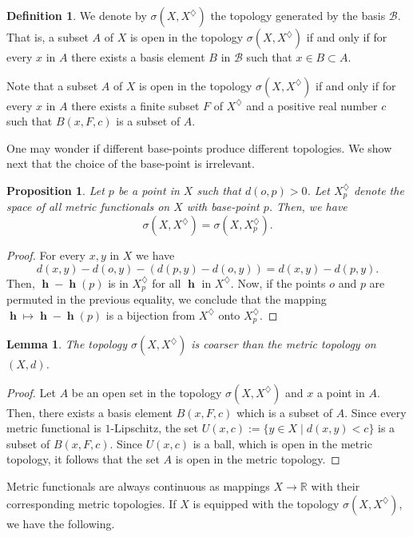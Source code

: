 \documentclass[11pt]{amsart}
\newtheorem{lemma}[theorem]{Lemma}
\newtheorem{proposition}[theorem]{Proposition}
\theoremstyle{definition}
\newtheorem{definition}[theorem]{Definition}
\numberwithin{equation}{section}
\DeclareMathOperator{\h}{\mathbf{h}} %
\newcommand{\R}{\mathbb{R}}  %
\numberwithin{equation}{section}
\begin{document}
\begin{definition}
We denote by $\sigma(X,X^\diamondsuit)$ the topology generated 
by the basis $\mathscr{B}$. That is, a subset $A$ of $X$ is 
open in the topology $\sigma(X,X^\diamondsuit)$ if and only 
if for every $x$ in $A$ there exists a basis element $B$ 
in $\mathscr{B}$ such that $x\in B \subset A$.    
\end{definition}

Note that a subset $A$ of $X$ is open in the topology
$\sigma(X,X^\diamondsuit)$ if and only if for every $x$ 
in $A$ there exists a finite subset $F$ of $X^\diamondsuit$ 
and a positive real number $c$ such that $B(x,F,c)$ is a 
subset of $A$. 

One may wonder if different base-points produce different 
topologies. We show next that the choice of the base-point 
is irrelevant.

\begin{proposition}
Let $p$ be a point in $X$ such that $d(o,p)> 0$. 
Let $X_p^\diamondsuit$ denote the space of all metric functionals 
on $X$ with base-point $p$. Then, we have
$$
    \sigma(X,X^\diamondsuit)=\sigma(X,X_p^\diamondsuit).
$$
\end{proposition}
\begin{proof}
For every $x,y$ in $X$ we have 
$$ d(x,y)-d(o,y)-(d(p,y)-d(o,y)) = d(x,y)-d(p,y).$$
Then, $\h - \h(p)$ is in $X_p^\diamondsuit$ for all $\h$ in 
$X^\diamondsuit$. Now, if the points $o$ and $p$ are permuted 
in the previous equality, we conclude that the mapping 
$\h\mapsto \h - \h(p)$ is a bijection from $X^\diamondsuit$ 
onto $X_p^\diamondsuit$.
\end{proof}

\begin{lemma}\label{lem:coarse}
The topology $\sigma(X,X^\diamondsuit)$ is coarser than 
the metric topology on $(X,d)$. 
\end{lemma}

\begin{proof}
Let $A$ be an open set in the topology $\sigma(X,X^\diamondsuit)$
and $x$ a point in $A$. Then, there exists a basis element 
$B(x,F,c)$ which is a subset of $A$. Since every metric 
functional is $1$-Lipschitz, the set 
$U(x,c):=\{y\in X \mid d(x,y) < c\}$ is a subset of 
$B(x,F,c)$. Since $U(x,c)$ is a ball, which is
open in the metric topology, it follows that the set $A$ 
is open in the metric topology.
\end{proof}

Metric functionals are always continuous as mappings 
$X\to\R$ with their corresponding metric topologies. 
If $X$ is equipped with the topology $\sigma(X,X^\diamondsuit)$,
we have the following.
\end{document}

